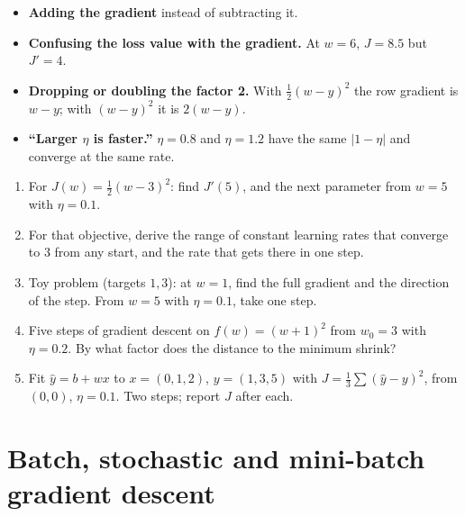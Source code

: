 \documentclass[11pt]{article}
\begin{document}
\begin{caution}
\begin{itemize}
  \item \textbf{Adding the gradient} instead of subtracting it.
  \item \textbf{Confusing the loss value with the gradient.} At $w = 6$,
    $J = 8.5$ but $J' = 4$.
  \item \textbf{Dropping or doubling the factor 2.} With $\tfrac12(w-y)^2$ the
    row gradient is $w - y$; with $(w - y)^2$ it is $2(w - y)$.
  \item \textbf{``Larger $\eta$ is faster.''} $\eta = 0.8$ and $\eta = 1.2$
    have the same $|1 - \eta|$ and converge at the same rate.
\end{itemize}
\end{caution}

\begin{tryit}
\begin{enumerate}[label=\textbf{E3.\arabic*}]
  \item For $J(w) = \tfrac12(w - 3)^2$: find $J'(5)$, and the next parameter
    from $w = 5$ with $\eta = 0.1$.
  \item For that objective, derive the range of constant learning rates that
    converge to $3$ from any start, and the rate that gets there in one step.
  \item Toy problem (targets $1, 3$): at $w = 1$, find the full gradient and
    the direction of the step. From $w = 5$ with $\eta = 0.1$, take one step.
  \item Five steps of gradient descent on $f(w) = (w + 1)^2$ from $w_0 = 3$ with
    $\eta = 0.2$. By what factor does the distance to the minimum shrink?
  \item Fit $\hat y = b + wx$ to $x = (0,1,2)$, $y = (1,3,5)$ with
    $J = \frac13\sum(\hat y - y)^2$, from $(0,0)$, $\eta = 0.1$. Two steps;
    report $J$ after each.
\end{enumerate}
\end{tryit}

\section{Batch, stochastic and mini-batch gradient descent}
\label{sec:sgd}
\end{document}
